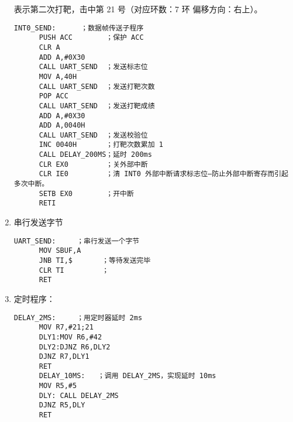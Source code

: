 \begin{enumerate}
  表示第二次打靶，击中第 21 号（对应环数：7 环 偏移方向：右上）。
  \begin{lstlisting}[basicstyle=\linespread{1.3}\selectfont, breaklines=true]
      INT0_SEND:      ；数据帧传送子程序
      PUSH ACC        ；保护 ACC
      CLR A
      ADD A,#0X30
      CALL UART_SEND  ；发送标志位
      MOV A,40H
      CALL UART_SEND  ；发送打靶次数
      POP ACC
      CALL UART_SEND  ；发送打靶成绩
      ADD A,#0X30
      ADD A,0040H
      CALL UART_SEND  ；发送校验位
      INC 0040H       ；打靶次数累加 1
      CALL DELAY_200MS；延时 200ms
      CLR EX0         ；关外部中断
      CLR IE0         ；清 INT0 外部中断请求标志位—防止外部中断寄存而引起多次中断。
      SETB EX0        ；开中断
      RETI
  \end{lstlisting}
  \item 串行发送字节
  \begin{lstlisting}[basicstyle=\linespread{1.3}\selectfont, breaklines=true]
      UART_SEND:     ；串行发送一个字节
      MOV SBUF,A
      JNB TI,$       ；等待发送完毕
      CLR TI         ；
      RET
  \end{lstlisting}
  \item 定时程序：
  \begin{lstlisting}[basicstyle=\linespread{1.3}\selectfont, breaklines=true]
      DELAY_2MS:     ；用定时器延时 2ms
      MOV R7,#21;21
      DLY1:MOV R6,#42
      DLY2:DJNZ R6,DLY2
      DJNZ R7,DLY1
      RET
      DELAY_10MS:   ；调用 DELAY_2MS，实现延时 10ms
      MOV R5,#5
      DLY: CALL DELAY_2MS
      DJNZ R5,DLY
      RET
\end{lstlisting}
\end{enumerate}